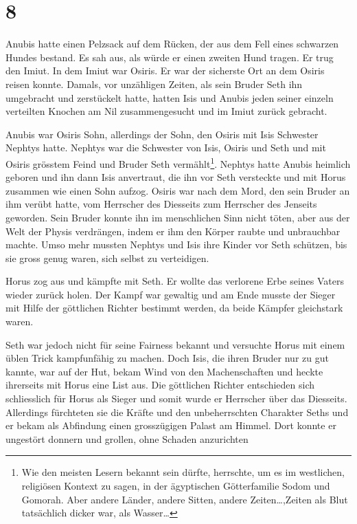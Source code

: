 \documentclass[11pt,titlepage,a5paper]{book}
\begin{document}
\section*{8}

Anubis hatte einen Pelzsack auf dem Rücken, der aus dem Fell eines schwarzen Hundes bestand. Es sah aus, als würde er einen zweiten Hund tragen. Er trug den Imiut. In dem Imiut war Osiris. Er war der sicherste Ort an dem Osiris reisen konnte. Damals, vor unzähligen Zeiten, als sein Bruder Seth ihn umgebracht und zerstückelt hatte, hatten Isis und Anubis jeden seiner einzeln verteilten Knochen am Nil zusammengesucht und im Imiut zurück gebracht. 

Anubis war Osiris Sohn, allerdings der Sohn, den Osiris mit Isis Schwester Nephtys hatte. Nephtys war die Schwester von Isis, Osiris und Seth und mit Osiris grösstem Feind und Bruder Seth vermählt\footnote{Wie den meisten Lesern bekannt sein dürfte, herrschte, um es im westlichen, religiösen Kontext zu sagen, in der ägyptischen Götterfamilie Sodom und Gomorah. Aber andere Länder, andere Sitten, andere Zeiten\dots ,Zeiten als Blut tatsächlich dicker war, als Wasser\dots}. Nephtys hatte Anubis heimlich geboren und ihn dann Isis anvertraut, die ihn vor Seth versteckte und mit Horus zusammen wie einen Sohn aufzog. Osiris war nach dem Mord, den sein Bruder an ihm verübt hatte, vom Herrscher des Diesseits zum Herrscher des Jenseits geworden. Sein Bruder konnte ihn im menschlichen Sinn nicht töten, aber aus der Welt der Physis verdrängen, indem er ihm den Körper raubte und unbrauchbar machte. Umso mehr mussten Nephtys und Isis ihre Kinder  vor Seth schützen, bis sie gross genug waren, sich selbst zu verteidigen.

Horus zog aus und kämpfte mit Seth. Er wollte das verlorene Erbe seines Vaters wieder zurück holen. Der Kampf war gewaltig und am Ende musste der Sieger mit Hilfe der göttlichen Richter bestimmt werden, da beide Kämpfer gleichstark waren. 

Seth war jedoch nicht für seine Fairness bekannt und versuchte Horus mit einem üblen Trick kampfunfähig zu machen. Doch Isis, die ihren Bruder nur zu gut kannte, war auf der Hut, bekam Wind von den Machenschaften und heckte ihrerseits mit Horus eine List aus. Die göttlichen Richter entschieden sich schliesslich für Horus als Sieger und somit wurde er Herrscher über das Diesseits. Allerdings fürchteten sie die Kräfte und den unbeherrschten Charakter Seths und er bekam als Abfindung einen grosszügigen Palast am Himmel. Dort konnte er ungestört donnern und grollen, ohne Schaden anzurichten
\end{document}
